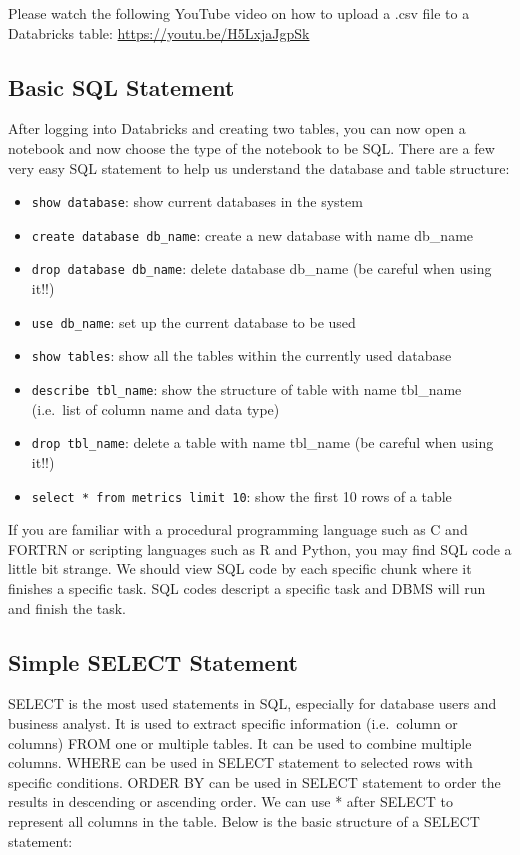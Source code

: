 \documentclass[]{book}
\providecommand{\tightlist}{%
  \setlength{\itemsep}{0pt}\setlength{\parskip}{0pt}}
\theoremstyle{definition}
\theoremstyle{definition}
\theoremstyle{remark}
\begin{document}
Please watch the following YouTube video on how to upload a .csv file to
a Databricks table: \url{https://youtu.be/H5LxjaJgpSk}

\subsection{Basic SQL Statement}\label{basic-sql-statement}

After logging into Databricks and creating two tables, you can now open
a notebook and now choose the type of the notebook to be SQL. There are
a few very easy SQL statement to help us understand the database and
table structure:

\begin{itemize}
\tightlist
\item
  \texttt{show\ database}: show current databases in the system
\item
  \texttt{create\ database\ db\_name}: create a new database with name
  db\_name
\item
  \texttt{drop\ database\ db\_name}: delete database db\_name (be
  careful when using it!!)
\item
  \texttt{use\ db\_name}: set up the current database to be used
\item
  \texttt{show\ tables}: show all the tables within the currently used
  database
\item
  \texttt{describe\ tbl\_name}: show the structure of table with name
  tbl\_name (i.e.~list of column name and data type)
\item
  \texttt{drop\ tbl\_name}: delete a table with name tbl\_name (be
  careful when using it!!)
\item
  \texttt{select\ *\ from\ metrics\ limit\ 10}: show the first 10 rows
  of a table
\end{itemize}

If you are familiar with a procedural programming language such as C and
FORTRN or scripting languages such as R and Python, you may find SQL
code a little bit strange. We should view SQL code by each specific
chunk where it finishes a specific task. SQL codes descript a specific
task and DBMS will run and finish the task.

\subsection{Simple SELECT Statement}\label{simple-select-statement}

SELECT is the most used statements in SQL, especially for database users
and business analyst. It is used to extract specific information
(i.e.~column or columns) FROM one or multiple tables. It can be used to
combine multiple columns. WHERE can be used in SELECT statement to
selected rows with specific conditions. ORDER BY can be used in SELECT
statement to order the results in descending or ascending order. We can
use * after SELECT to represent all columns in the table. Below is the
basic structure of a SELECT statement:
\end{document}

